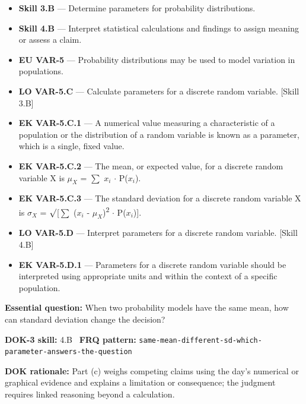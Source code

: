 \documentclass[11pt]{article}
\begin{document}


{\small
\begin{itemize}[leftmargin=1.5em,itemsep=2pt,topsep=2pt]
  \item \textbf{Skill 3.B} --- Determine parameters for probability distributions.
  \item \textbf{Skill 4.B} --- Interpret statistical calculations and findings to assign meaning or assess a claim.
  \item \textbf{EU VAR-5} --- Probability distributions may be used to model variation in populations.
  \item \textbf{LO VAR-5.C} --- Calculate parameters for a discrete random variable. [Skill 3.B]
  \item \textbf{EK VAR-5.C.1} --- A numerical value measuring a characteristic of a population or the distribution of a random variable is known as a parameter, which is a single, fixed value.
  \item \textbf{EK VAR-5.C.2} --- The mean, or expected value, for a discrete random variable X is $\mu_X$ = $\sum$ $x_i$ $\cdot$ P($x_i$).
  \item \textbf{EK VAR-5.C.3} --- The standard deviation for a discrete random variable X is $\sigma_X$ = $\surd$[$\sum$ ($x_i$ - $\mu_X$)\textsuperscript{2} $\cdot$ P($x_i$)].
  \item \textbf{LO VAR-5.D} --- Interpret parameters for a discrete random variable. [Skill 4.B]
  \item \textbf{EK VAR-5.D.1} --- Parameters for a discrete random variable should be interpreted using appropriate units and within the context of a specific population.
\end{itemize}
}
\textbf{Essential question:} When two probability models have the same mean, how can standard deviation change the decision?\par
\textbf{DOK-3 skill:} 4.B \textperiodcentered\ \textbf{FRQ pattern:} {\small\texttt{same-\allowbreak{}mean-\allowbreak{}different-\allowbreak{}sd-\allowbreak{}which-\allowbreak{}parameter-\allowbreak{}answers-\allowbreak{}the-\allowbreak{}question}}\par
\textbf{DOK rationale:} Part (c) weighs competing claims using the day's numerical or graphical evidence and explains a limitation or consequence; the judgment requires linked reasoning beyond a calculation.\par
\end{document}
